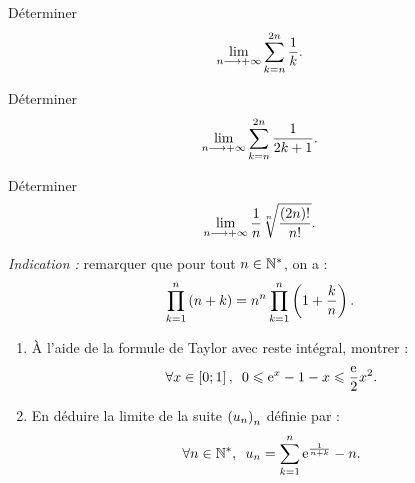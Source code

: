 \begin{corr}
\end{corr}

\begin{exo}
Déterminer \[\lim_{n\longrightarrow+\infty}\sum_{k=n}^{2n}\dfrac{1}{k}.\]
\end{exo}

\begin{corr}
\end{corr}

\begin{exo}
Déterminer \[\lim_{n\longrightarrow+\infty}\sum_{k=n}^{2n}\dfrac{1}{2k+1}.\]
\end{exo}

\begin{corr}
\end{corr}

\begin{exo}
Déterminer \[\lim_{n\longrightarrow+\infty}\dfrac{1}{n}\sqrt[n]{\dfrac{\left(2n\right)!}{n!}}.\]

\textit{Indication :} remarquer que pour tout \(n\in\mathbb{N}^*\), on a : \[\prod_{k=1}^n\left(n+k\right)=n^n\prod_{k=1}^n\left(1+\dfrac{k}{n}\right).\]
\end{exo}

\begin{corr}
\end{corr}

\begin{exo}[ENSEA 2018]
\begin{enumerate}
\item À l'aide de la formule de Taylor avec reste intégral, montrer : \[\quantifs{\forall x\in\intervii{0}{1}}0\leq\e{x}-1-x\leq\dfrac{\e{}}{2}x^2.\]

\item En déduire la limite de la suite \(\left(u_n\right)_n\) définie par : \[\quantifs{\forall n\in\Ns}u_n=\sum_{k=1}^n\e{\frac{1}{n+k}}-n.\]
\end{enumerate}
\end{exo}

\begin{corr}
\end{corr}